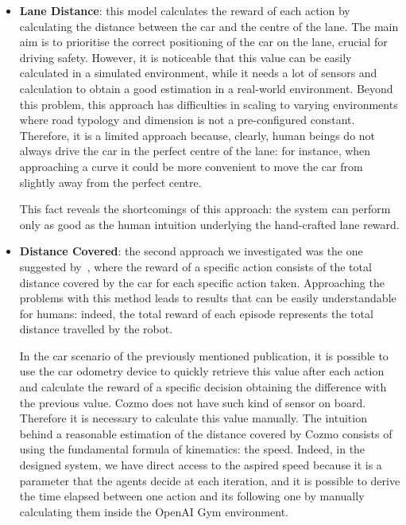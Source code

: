 \begin{itemize}
    \item \textbf{Lane Distance}: this model calculates the reward of each action by calculating the distance between the car and the centre of the lane.
          The main aim is to prioritise the correct positioning of the car on the lane, crucial for driving safety.
          However, it is noticeable that this value can be easily calculated in a simulated environment, while it needs a lot of sensors and calculation to obtain a good estimation in a real-world environment.
          Beyond this problem, this approach has difficulties in scaling to varying environments where road typology and dimension is not a pre-configured constant.
          Therefore, it is a limited approach because, clearly, human beings do not always drive the car in the perfect centre of the lane: for instance, when approaching a curve it could be more convenient to move the car from slightly away from the perfect centre.

          This fact reveals the shortcomings of this approach: the system can perform only as good as the human intuition underlying the hand-crafted lane reward.

    \item \textbf{Distance Covered}: the second approach we investigated was the one suggested by~\cite{kendall2018learning,kendall2019learning}, where the reward of a specific action consists of the total distance covered by the car for each specific action taken.
          Approaching the problems with this method leads to results that can be easily understandable for humans: indeed, the total reward of each episode represents the total distance travelled by the robot.

          In the car scenario of the previously mentioned publication, it is possible to use the car odometry device to quickly retrieve this value after each action and calculate the reward of a specific decision obtaining the difference with the previous value.
          Cozmo does not have such kind of sensor on board.
          Therefore it is necessary to calculate this value manually.
          The intuition behind a reasonable estimation of the distance covered by Cozmo consists of using the fundamental formula of kinematics: the speed.
          Indeed, in the designed system, we have direct access to the aspired speed because it is a parameter that the agents decide at each iteration, and it is possible to derive the time elapsed between one action and its following one by manually calculating them inside the OpenAI Gym environment.


\end{itemize}
